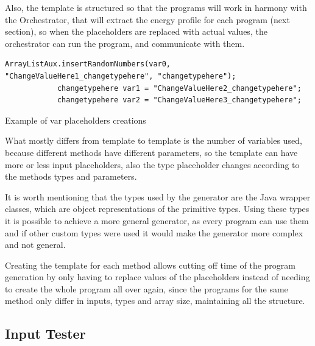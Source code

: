 Also, the template is structured so that the programs will work in harmony with the Orchestrator, that will extract the energy profile for each program (next section), so when the placeholders are replaced with actual values, the orchestrator can run the program, and communicate with them.

\begin{listing}[H]
\begin{verbatim}
ArrayListAux.insertRandomNumbers(var0, "ChangeValueHere1_changetypehere", "changetypehere");
            changetypehere var1 = "ChangeValueHere2_changetypehere";
            changetypehere var2 = "ChangeValueHere3_changetypehere";
\end{verbatim}
\caption{Example of var placeholders creations}            
\label{lst:var_placeholders}
\end{listing}

What mostly differs from template to template is the number of variables used, because different methods have different parameters, so the template can have more or less input placeholders, also the type placeholder changes according to the methods types and parameters.

It is worth mentioning that the types used by the generator are the Java wrapper classes, which are object representations of the primitive types. Using these types it is possible to achieve a more general generator, as every program can use them and if other custom types were used it would make the generator more complex and not general.

Creating the template for each method allows cutting off time of the program generation by only having to replace values of the placeholders instead of needing to create the whole program all over again, since the programs for the same method only differ in inputs, types and array size, maintaining all the structure.

\subsection{Input Tester} \label{sec:work_stage1_input_tester}

